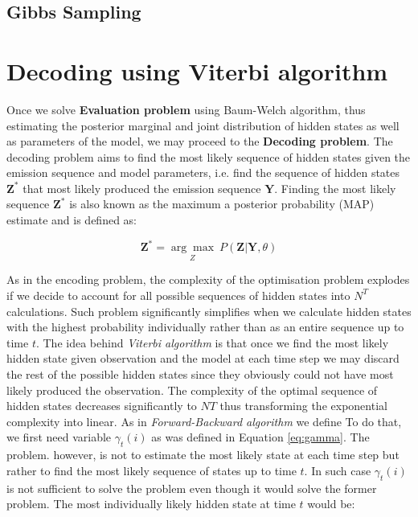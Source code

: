 \subsection{Gibbs Sampling}

\section{Decoding using Viterbi algorithm}

Once we solve \textbf{Evaluation problem} using Baum-Welch algorithm, thus estimating the posterior marginal and joint distribution of hidden states as well as parameters of the model,
we may proceed to the \textbf{Decoding problem}. The decoding problem aims to find the most likely sequence of hidden states given the emission sequence and model parameters, i.e. 
find the sequence of hidden states $\textbf{Z}^*$ that most likely produced the emission sequence $\textbf{Y}$. Finding the most likely sequence $\textbf{Z}^*$ is also known as 
the maximum a posterior probability (MAP) estimate and is defined as:

\begin{equation} \label{eq:MAP}
    \textbf{Z}^* = \underset{Z}{\arg\max} \: P(\textbf{Z}|\textbf{Y},\theta)
\end{equation}

As in the encoding problem, the complexity of the optimisation problem explodes if we decide to account for all possible sequences of hidden states into $N^T$ calculations. 
Such problem significantly simplifies when we calculate hidden states with the highest probability individually rather than as an entire sequence up to time $t$. 
The idea behind \textit{Viterbi algorithm} is that once we find the most likely hidden state given observation and the model at each time step 
we may discard the rest of the possible hidden states since they obviously could not have most likely produced the observation. The complexity of the optimal 
sequence of hidden states decreases significantly to $NT$ thus transforming the exponential complexity into linear. As in \textit{Forward-Backward algorithm} we define 
To do that, we first need variable $\gamma_t(i)$ as was defined in Equation \ref{eq:gamma}. The problem. however, is not to estimate the most likely state at each time step
but rather to find the most likely sequence of states up to time $t$. In such case $\gamma_t(i)$ is not sufficient to solve the problem even though it would solve the former problem.
The most individually likely hidden state at time $t$ would be:

